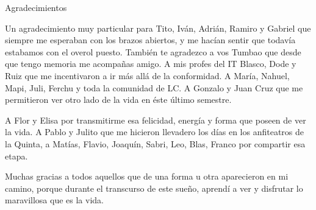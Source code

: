 \documentclass[12pt,papel,oneside]{ibtesis}
\begin{document}
\begin{postliminary}
\begin{seccion}{Agradecimientos}
\begin{footnotesize}
Un agradecimiento muy particular para Tito, Iván, Adrián, Ramiro y Gabriel  que siempre me esperaban con los brazos abiertos, y me hacían sentir que todavía estabamos con el overol puesto. También te agradezco a vos Tumbao que desde que tengo memoria me acompañas amigo. A mis profes del IT Blasco, Dode y Ruiz que me incentivaron a ir más allá de la conformidad. A María, Nahuel, Mapi, Juli, Ferchu y toda la comunidad de LC. A Gonzalo y Juan Cruz que me permitieron ver otro lado de la vida en éste último semestre.

A Flor y Elisa por transmitirme esa felicidad, energía y forma que poseen de  ver la vida. A Pablo y Julito que me hicieron llevadero los días en los anfiteatros de la Quinta, a Matías, Flavio, Joaquín, Sabri, Leo, Blas, Franco por compartir esa etapa.

Muchas gracias a todos aquellos que de una forma u otra aparecieron en mi camino, porque durante el transcurso de este sueño, aprendí a ver y disfrutar lo maravillosa que es la vida.

\end{footnotesize}


\end{seccion}



\end{postliminary}
\end{document}
